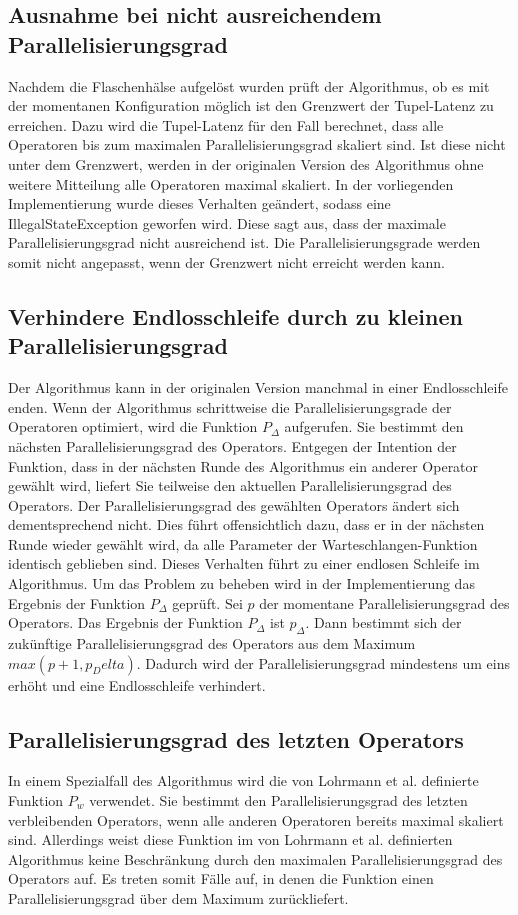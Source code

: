 \subsection{Ausnahme bei nicht ausreichendem Parallelisierungsgrad}
Nachdem die Flaschenhälse aufgelöst wurden prüft der Algorithmus, ob es mit der momentanen Konfiguration möglich ist den Grenzwert der Tupel-Latenz zu erreichen.
Dazu wird die Tupel-Latenz für den Fall berechnet, dass alle Operatoren bis zum maximalen Parallelisierungsgrad skaliert sind. Ist diese nicht unter dem Grenzwert, werden in der originalen Version des Algorithmus ohne weitere Mitteilung alle Operatoren maximal skaliert. In der vorliegenden Implementierung wurde dieses Verhalten geändert, sodass eine IllegalStateException geworfen wird. Diese sagt aus, dass der maximale Parallelisierungsgrad nicht ausreichend ist. Die Parallelisierungsgrade werden somit nicht angepasst, wenn der Grenzwert nicht erreicht werden kann.

\subsection{Verhindere Endlosschleife durch zu kleinen Parallelisierungsgrad}
Der Algorithmus kann in der originalen Version manchmal in einer Endlosschleife enden.
Wenn der Algorithmus schrittweise die Parallelisierungsgrade der Operatoren optimiert, wird die Funktion \(P_\Delta\) aufgerufen.
Sie bestimmt den nächsten Parallelisierungsgrad des Operators.
Entgegen der Intention der Funktion, dass in der nächsten Runde des Algorithmus ein anderer Operator gewählt wird, liefert Sie teilweise den aktuellen Parallelisierungsgrad des Operators.
Der Parallelisierungsgrad des gewählten Operators ändert sich dementsprechend nicht.
Dies führt offensichtlich dazu, dass er in der nächsten Runde wieder gewählt wird, da alle Parameter der Warteschlangen-Funktion identisch geblieben sind.
Dieses Verhalten führt zu einer endlosen Schleife im Algorithmus.
Um das Problem zu beheben wird in der Implementierung das Ergebnis der Funktion \(P_\Delta\) geprüft.
Sei \(p\) der momentane Parallelisierungsgrad des Operators.
Das Ergebnis der Funktion \(P_\Delta\) ist \(p_\Delta\).
Dann bestimmt sich der zukünftige Parallelisierungsgrad des Operators aus dem Maximum \(max(p+1, p_Delta)\).
Dadurch wird der Parallelisierungsgrad mindestens um eins erhöht und eine Endlosschleife verhindert.

\subsection{Parallelisierungsgrad des letzten Operators}
In einem Spezialfall des Algorithmus wird die von Lohrmann et al. definierte Funktion \(P_w\) verwendet. 
Sie bestimmt den Parallelisierungsgrad des letzten verbleibenden Operators, wenn alle anderen Operatoren bereits maximal skaliert sind.
Allerdings weist diese Funktion im von Lohrmann et al. definierten Algorithmus keine Beschränkung durch den maximalen Parallelisierungsgrad des Operators auf. 
Es treten somit Fälle auf, in denen die Funktion einen Parallelisierungsgrad über dem Maximum zurückliefert.

